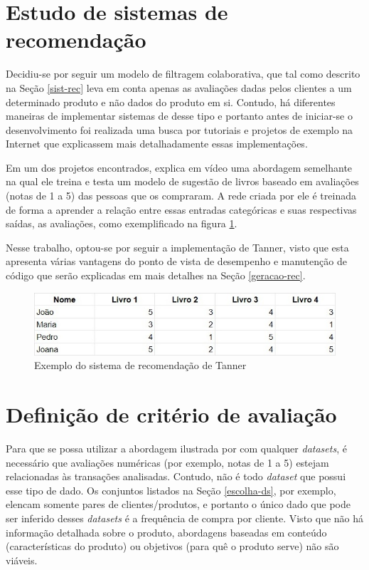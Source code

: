\section{Estudo de sistemas de recomendação} \label{estudo-sist}
Decidiu-se por seguir um modelo de filtragem colaborativa, que tal como descrito na Seção \ref{sist-rec} leva em conta apenas as avaliações dadas pelos clientes a um determinado produto e não dados do produto em si. Contudo, há diferentes maneiras de implementar sistemas de desse tipo e portanto antes de iniciar-se o desenvolvimento foi realizada uma busca por tutoriais e projetos de exemplo na Internet que explicassem mais detalhadamente essas implementações. 

Em um dos projetos encontrados,  explica em vídeo uma abordagem semelhante na qual ele treina e testa um modelo de sugestão de livros baseado em avaliações (notas de 1 a 5) das pessoas que os compraram. A rede criada por ele é treinada de forma a aprender a relação entre essas entradas categóricas e suas respectivas saídas, as avaliações, como exemplificado na figura \ref{fig:tanner}.

Nesse trabalho, optou-se por seguir a implementação de Tanner, visto que esta apresenta várias vantagens do ponto de vista de desempenho e manutenção de código que serão explicadas em mais detalhes na Seção \ref{geracao-rec}.

\begin{figure}[htp]
    \centering
    \includegraphics[width=12cm]{doc/latex/text/images/tanner.jpg}
    \caption{Exemplo do sistema de recomendação de Tanner}
    \label{fig:tanner}
\end{figure}

\section{Definição de critério de avaliação} \label{definicao-crit}
Para que se possa utilizar a abordagem ilustrada por  com qualquer \textit{datasets}, é necessário que avaliações numéricas (por exemplo, notas de 1 a 5) estejam relacionadas às transações analisadas. Contudo, não é todo \textit{dataset} que possui esse tipo de dado. Os conjuntos listados na Seção \ref{escolha-ds}, por exemplo, elencam somente pares de clientes/produtos, e portanto o único dado que pode ser inferido desses \textit{datasets} é a frequência de compra por cliente. Visto que não há informação detalhada sobre o produto, abordagens baseadas em conteúdo (características do produto) ou objetivos (para quê o produto serve) não são viáveis.

